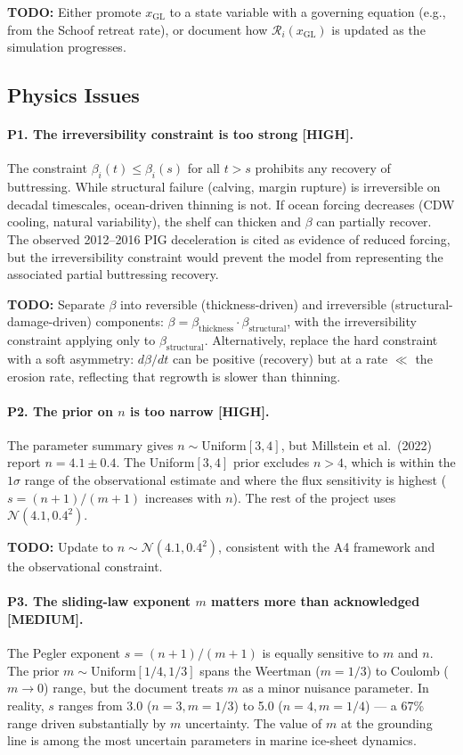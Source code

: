\documentclass[11pt]{article}
\theoremstyle{definition}
\begin{document}
\textbf{TODO:} Either promote $x_{\text{GL}}$ to a state variable with a governing equation (e.g., from the Schoof retreat rate), or document how $\mathcal{R}_i(x_{\text{GL}})$ is updated as the simulation progresses.

\subsection{Physics Issues}

\paragraph{P1. The irreversibility constraint is too strong [HIGH].}
The constraint $\beta_i(t) \leq \beta_i(s)$ for all $t > s$ prohibits any recovery of buttressing.  While structural failure (calving, margin rupture) is irreversible on decadal timescales, ocean-driven thinning is not.  If ocean forcing decreases (CDW cooling, natural variability), the shelf can thicken and $\beta$ can partially recover.  The observed 2012--2016 PIG deceleration is cited as evidence of reduced forcing, but the irreversibility constraint would prevent the model from representing the associated partial buttressing recovery.

\textbf{TODO:} Separate $\beta$ into reversible (thickness-driven) and irreversible (structural-damage-driven) components: $\beta = \beta_{\text{thickness}} \cdot \beta_{\text{structural}}$, with the irreversibility constraint applying only to $\beta_{\text{structural}}$.  Alternatively, replace the hard constraint with a soft asymmetry: $d\beta/dt$ can be positive (recovery) but at a rate $\ll$ the erosion rate, reflecting that regrowth is slower than thinning.

\paragraph{P2. The prior on $n$ is too narrow [HIGH].}
The parameter summary gives $n \sim \text{Uniform}[3, 4]$, but Millstein et al.\ (2022) report $n = 4.1 \pm 0.4$.  The Uniform$[3, 4]$ prior excludes $n > 4$, which is within the $1\sigma$ range of the observational estimate and where the flux sensitivity is highest ($s = (n+1)/(m+1)$ increases with $n$).  The rest of the project uses $\mathcal{N}(4.1, 0.4^2)$.

\textbf{TODO:} Update to $n \sim \mathcal{N}(4.1, 0.4^2)$, consistent with the A4 framework and the observational constraint.

\paragraph{P3. The sliding-law exponent $m$ matters more than acknowledged [MEDIUM].}
The Pegler exponent $s = (n+1)/(m+1)$ is equally sensitive to $m$ and $n$.  The prior $m \sim \text{Uniform}[1/4, 1/3]$ spans the Weertman ($m = 1/3$) to Coulomb ($m \to 0$) range, but the document treats $m$ as a minor nuisance parameter.  In reality, $s$ ranges from 3.0 ($n=3, m=1/3$) to 5.0 ($n=4, m=1/4$) --- a 67\% range driven substantially by $m$ uncertainty.  The value of $m$ at the grounding line is among the most uncertain parameters in marine ice-sheet dynamics.
\end{document}
